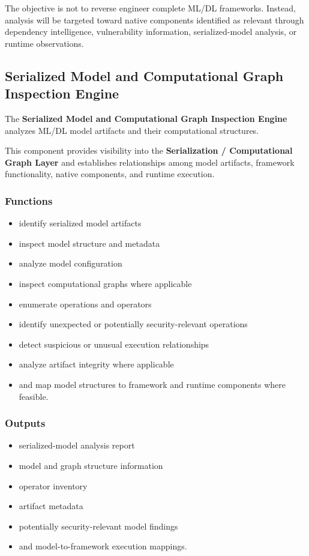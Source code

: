 \documentclass[
  12pt,
  letterpaper,
  oneside]{report}
\providecommand{\tightlist}{%
  \setlength{\itemsep}{0pt}\setlength{\parskip}{0pt}}
\begin{document}
The objective is not to reverse engineer complete ML/DL frameworks.
Instead, analysis will be targeted toward native components identified
as relevant through dependency intelligence, vulnerability information,
serialized-model analysis, or runtime observations.

\subsection{Serialized Model and Computational Graph Inspection Engine}\label{1035-serialized-model-and-computational-graph-inspection-engine}

The \textbf{Serialized Model and Computational Graph Inspection Engine}
analyzes ML/DL model artifacts and their computational structures.

This component provides visibility into the \textbf{Serialization /
Computational Graph Layer} and establishes relationships among model
artifacts, framework functionality, native components, and runtime
execution.

\subsubsection{Functions}\label{functions-4}

\begin{itemize}
\tightlist
\item
  identify serialized model artifacts
\item
  inspect model structure and metadata
\item
  analyze model configuration
\item
  inspect computational graphs where applicable
\item
  enumerate operations and operators
\item
  identify unexpected or potentially security-relevant operations
\item
  detect suspicious or unusual execution relationships
\item
  analyze artifact integrity where applicable
\item
  and map model structures to framework and runtime components where
  feasible.
\end{itemize}

\subsubsection{Outputs}\label{outputs-4}

\begin{itemize}
\tightlist
\item
  serialized-model analysis report
\item
  model and graph structure information
\item
  operator inventory
\item
  artifact metadata
\item
  potentially security-relevant model findings
\item
  and model-to-framework execution mappings.
\end{itemize}
\end{document}
